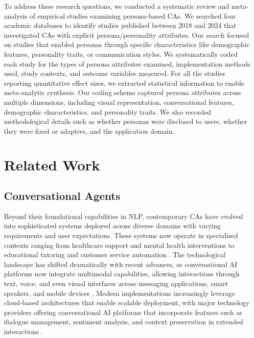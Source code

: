 \documentclass{article}
\begin{document}
To address these research questions, we conducted a systematic review and meta-analysis of empirical studies examining persona-based CAs. We searched four academic databases to identify studies published between 2018 and 2024 that investigated CAs with explicit persona/personality attributes. Our search focused on studies that enabled personas through specific characteristics like demographic features, personality traits, or communication styles. We systematically coded each study for the types of persona attributes examined, implementation methods used, study contexts, and outcome variables measured. For all the studies reporting quantitative effect sizes, we extracted statistical information to enable meta-analytic synthesis. Our coding scheme captured persona attributes across multiple dimensions, including visual representation, conversational features, demographic characteristics, and personality traits. We also recorded methodological details such as whether personas were disclosed to users, whether they were fixed or adaptive, and the application domain. 

\section{Related Work}
\subsection{Conversational Agents}

Beyond their foundational capabilities in NLP, contemporary CAs have evolved into sophisticated systems deployed across diverse domains with varying requirements and user expectations. These systems now operate in specialized contexts ranging from healthcare support and mental health interventions to educational tutoring and customer service automation \citep{mariani2023artificial,nguyen2024conversational}. The technological landscape has shifted dramatically with recent advances, as conversational AI platforms now integrate multimodal capabilities, allowing interactions through text, voice, and even visual interfaces across messaging applications, smart speakers, and mobile devices \citep{allouch2021conversational}. Modern implementations increasingly leverage cloud-based architectures that enable scalable deployment, with major technology providers offering conversational AI platforms that incorporate features such as dialogue management, sentiment analysis, and context preservation in extended interactions \citep{schobel2024charting}.
\end{document}
